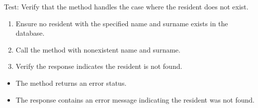 \documentclass[letterpaper,10pt,english]{sphinxmanual}
\begin{document}
\begin{fulllineitems}
\label{\detokenize{test:test.test_residetnt.test_get_resident_room_resident_not_found}}
\pysigstartsignatures
\pysiglinewithargsret
{}
{}
{}
\pysigstopsignatures
\sphinxAtStartPar
Test: Verify that the method handles the case where the resident does not exist.
\begin{description}
\begin{enumerate}
%
\item {} 
\sphinxAtStartPar
Ensure no resident with the specified name and surname exists in the database.

\item {} 
\sphinxAtStartPar
Call the  method with non\sphinxhyphen{}existent name and surname.

\item {} 
\sphinxAtStartPar
Verify the response indicates the resident is not found.

\end{enumerate}

\begin{itemize}
\item {} 
\sphinxAtStartPar
The method returns an error status.

\item {} 
\sphinxAtStartPar
The response contains an error message indicating the resident was not found.

\end{itemize}

\end{description}

\end{fulllineitems}

\end{document}
